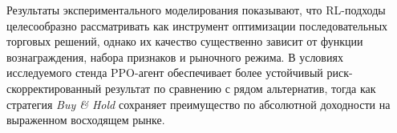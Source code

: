 \noindent
Результаты экспериментального моделирования показывают, что RL-подходы целесообразно рассматривать как инструмент оптимизации последовательных торговых решений, однако их качество существенно зависит от функции вознаграждения, набора признаков и рыночного режима. В условиях исследуемого стенда PPO-агент обеспечивает более устойчивый риск-скорректированный результат по сравнению с рядом альтернатив, тогда как стратегия \textit{Buy \& Hold} сохраняет преимущество по абсолютной доходности на выраженном восходящем рынке.
